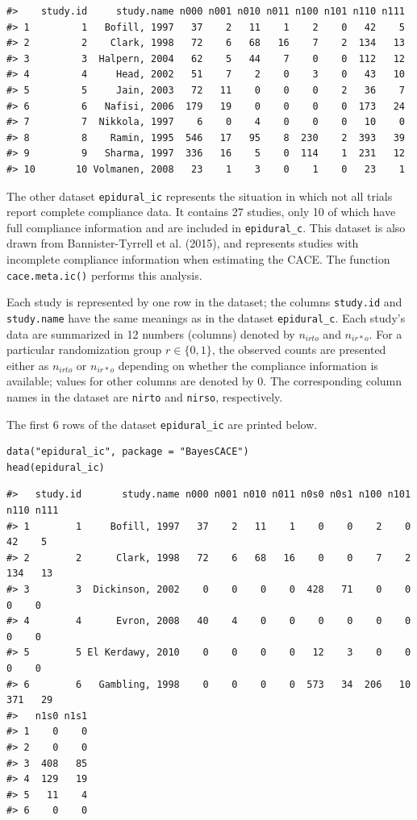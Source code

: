 \begin{verbatim}
#>    study.id     study.name n000 n001 n010 n011 n100 n101 n110 n111
#> 1         1   Bofill, 1997   37    2   11    1    2    0   42    5
#> 2         2    Clark, 1998   72    6   68   16    7    2  134   13
#> 3         3  Halpern, 2004   62    5   44    7    0    0  112   12
#> 4         4     Head, 2002   51    7    2    0    3    0   43   10
#> 5         5     Jain, 2003   72   11    0    0    0    2   36    7
#> 6         6   Nafisi, 2006  179   19    0    0    0    0  173   24
#> 7         7  Nikkola, 1997    6    0    4    0    0    0   10    0
#> 8         8    Ramin, 1995  546   17   95    8  230    2  393   39
#> 9         9   Sharma, 1997  336   16    5    0  114    1  231   12
#> 10       10 Volmanen, 2008   23    1    3    0    1    0   23    1
\end{verbatim}

The other dataset \texttt{epidural\_ic} represents the situation in which not all trials report complete compliance data. It contains 27 studies, only 10 of which have full compliance information and are included in \texttt{epidural\_c}. This dataset is also drawn from Bannister-Tyrrell et al. (2015), and represents studies with incomplete compliance information when estimating the CACE. The function \texttt{cace.meta.ic()} performs this analysis.

Each study is represented by one row in the dataset; the columns \texttt{study.id} and \texttt{study.name} have the same meanings as in the dataset \texttt{epidural\_c}. Each study's data are summarized in 12 numbers (columns) denoted by \(n_{irto}\) and \(n_{ir*o}\). For a particular randomization group \(r \in \{0, 1\}\), the observed counts are presented either as \(n_{irto}\) or \(n_{ir*o}\) depending on whether the compliance information is available; values for other columns are denoted by 0. The corresponding column names in the dataset are \texttt{nirto} and \texttt{nirso}, respectively.

The first 6 rows of the dataset \texttt{epidural\_ic} are printed below.

\begin{verbatim}
data("epidural_ic", package = "BayesCACE")
head(epidural_ic)
\end{verbatim}

\begin{verbatim}
#>   study.id       study.name n000 n001 n010 n011 n0s0 n0s1 n100 n101 n110 n111
#> 1        1     Bofill, 1997   37    2   11    1    0    0    2    0   42    5
#> 2        2      Clark, 1998   72    6   68   16    0    0    7    2  134   13
#> 3        3  Dickinson, 2002    0    0    0    0  428   71    0    0    0    0
#> 4        4      Evron, 2008   40    4    0    0    0    0    0    0    0    0
#> 5        5 El Kerdawy, 2010    0    0    0    0   12    3    0    0    0    0
#> 6        6   Gambling, 1998    0    0    0    0  573   34  206   10  371   29
#>   n1s0 n1s1
#> 1    0    0
#> 2    0    0
#> 3  408   85
#> 4  129   19
#> 5   11    4
#> 6    0    0
\end{verbatim}

